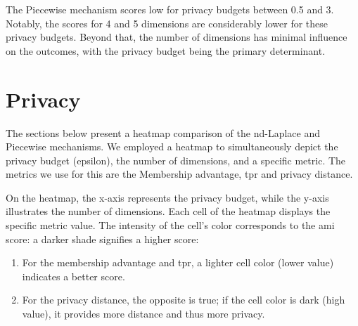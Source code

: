 The Piecewise mechanism scores low for privacy budgets between 0.5 and 3. Notably, the scores for 4 and 5 dimensions are considerably lower for these privacy budgets. Beyond that, the number of dimensions has minimal influence on the outcomes, with the privacy budget being the primary determinant.
\newpage
\section{Privacy}
The sections below present a heatmap comparison of the nd-Laplace and Piecewise mechanisms.
We employed a heatmap to simultaneously depict the privacy budget (epsilon), the number of dimensions, and a specific metric. The metrics we use for this are the Membership advantage, \gls{tpr} and privacy distance.

On the heatmap, the x-axis represents the privacy budget, while the y-axis illustrates the number of dimensions. Each cell of the heatmap displays the specific metric value. The intensity of the cell's color corresponds to the \gls{ami} score: a darker shade signifies a higher score:
\begin{enumerate}
  \item  For the membership advantage and \gls{tpr}, a lighter cell color (lower value) indicates a better score.
  \item For the privacy distance, the opposite is true; if the cell color is dark (high value), it provides more distance and thus more privacy.
\end{enumerate}
\newpage
